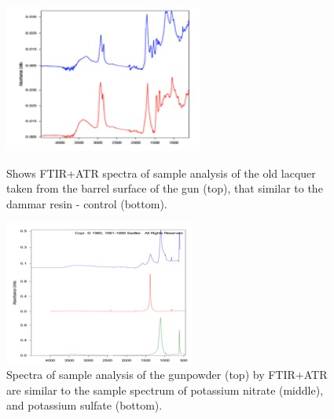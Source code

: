 \begin{figure}[!htb] 
	\begin{minipage}[b]{0.5\linewidth}
		\centering
	\includegraphics[width=.9\linewidth]{figures/zidan_Fig4}
	\caption{Shows FTIR+ATR spectra of sample analysis of the old lacquer taken from the barrel surface of the gun (top), that similar to the dammar resin - control (bottom).}
	\label{fig:Fig4}
	\end{minipage} 
	\begin{minipage}[b]{0.5\linewidth}
		\centering
		\includegraphics[width=.9\linewidth]{figures/zidan_Fig5}
		\caption{Spectra of sample analysis of the gunpowder (top) by FTIR+ATR are similar to the sample spectrum of potassium nitrate (middle), and potassium sulfate (bottom).}
		\label{fig:Fig5}
	\end{minipage} 
\end{figure}


